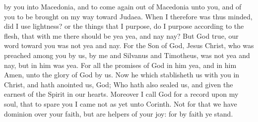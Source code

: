 {by
you
into
Macedonia,
and to
come
again out
of
Macedonia
unto
you,
and
of
you to be brought on my
way
toward
Judaea.
When I
therefore
was
thus
minded,
did I
use
lightness?
or the
things that I
purpose, do I
purpose according
to the
flesh,
that
with
me there should
be
yea
yea,
and
nay
nay?
But
{}
God
{}
true,
our
word
toward
you
was
not
yea
and
nay.
For the
Son of
God,
Jesus
Christ,
who was
preached
among
you
by
us,
{}
by
me
and
Silvanus
and
Timotheus,
was
not
yea
and
nay,
but
in
him
was
yea.
For
all the
promises of
God
in
him
{}
yea,
and
in
him
Amen,
unto the
glory of
God
by
us.
Now he
which
stablisheth
us
with
you
in
Christ,
and hath
anointed
us,
{}
God;
Who
hath
also
sealed
us,
and
given the
earnest of the
Spirit
in
our
hearts.
Moreover
I
call
God for a
record
upon
my
soul,
that to
spare
you I
came not as
yet
unto
Corinth.
Not for
that we have
dominion over
your
faith,
but
are
helpers of
your
joy:
for by
faith ye
stand.

}

